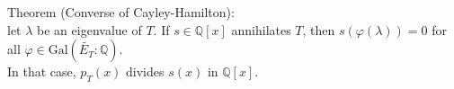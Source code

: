 \documentclass[preview]{standalone}
\begin{document}
\begin{center}
Theorem (Converse of Cayley-Hamilton): \\ let $\lambda$ be an eigenvalue of $T$. If $s \in \mathbb{Q}[x]$ annihilates $T$, then $s(\varphi(\lambda)) = 0$ for all $\varphi \in \text{Gal}\left(\widetilde{E_T} : \mathbb{Q}\right)$. \\[0.2cm] In that case, $p_T(x)$ divides $s(x)$ in $\mathbb{Q}[x]$.
\end{center}
\end{document}
